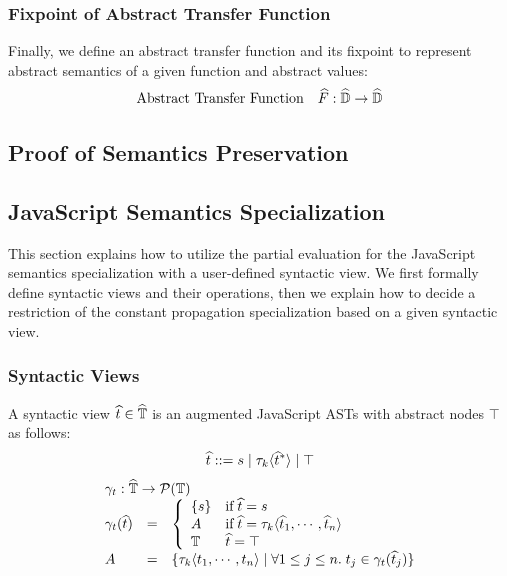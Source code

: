 \subsubsection{Fixpoint of Abstract Transfer Function} Finally, we define an
abstract transfer function and its fixpoint to represent abstract semantics of a
given function and abstract values:
\[
  \begin{array}{ll}
    \text{Abstract Transfer Function} & \widehat{F}: \widehat{\mathbb{D}} \rightarrow
    \widehat{\mathbb{D}}\\
\end{array}
\]

\todo


\subsection{Proof of Semantics Preservation}

\todo





\subsection{JavaScript Semantics Specialization}

This section explains how to utilize the partial evaluation for the JavaScript
semantics specialization with a user-defined syntactic view.  We first formally
define syntactic views and their operations, then we explain how to decide a
restriction of the constant propagation specialization based on a given
syntactic view.

\subsubsection{Syntactic Views} A syntactic view $\widehat{t} \in \widehat{\mathbb{T}}$ is an
augmented JavaScript ASTs with abstract nodes $\top$ as follows:
\[
  \widehat{t} ::= s \mid \tau_k \langle \widehat{t}^* \rangle \mid \top
\]
\[
  \begin{array}{lcl}
    \multicolumn{3}{l}{\treegamma: \atreeset \rightarrow \powerset{\treeset}}\\
    \treegamma(\atree) &=& \left\{
      \begin{array}{ll}
        \{ \str \} &
        \text{if} \; \atree = \str \\

        A & \text{if} \; \atree = \ty_k
        \langle \atree_1, \cdots, \atree_n \rangle \\

        \treeset & \atree = \top\\
      \end{array}
    \right.\\
    A &=& \{ \ty_k \langle \tree_1, \cdots, \tree_n \rangle \mid \forall 1 \leq
    j \leq n.  \; \tree_j \in \treegamma(\atree_j) \}
  \end{array}
\]

